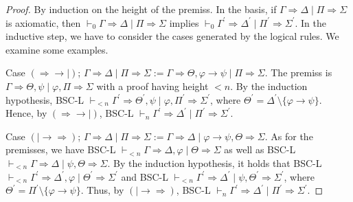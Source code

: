 \documentclass[10pt,a4paper]{article}
\theoremstyle{definition}
\newcommand{\3}{\vspace{.3in}}
\newcommand{\2}{\vspace{.2in}}
\newcommand{\1}{\vspace{.1in}}
\newcommand{\5}{\vspace{.05in}}
\begin{document}
\begin{proof}
	By induction on the height of the premiss. In the basis, if $ \Gamma\Rightarrow\Delta\mid\Pi\Rightarrow\Sigma $ is
	axiomatic, then $ \vdash_0\Gamma\Rightarrow\Delta\mid\Pi\Rightarrow\Sigma $ implies $ \vdash_0 \Gamma^\prime\Rightarrow\Delta^\prime\mid\Pi^\prime\Rightarrow\Sigma^\prime$. In the
	inductive step, we have to consider the cases generated by the logical rules. We examine some examples.
	
Case $ (\Rightarrow\rightarrow\mid) $; $ \Gamma\Rightarrow\Delta\mid\Pi\Rightarrow\Sigma:=\Gamma\Rightarrow\Theta,\varphi\rightarrow\psi\mid\Pi\Rightarrow\Sigma $. The premiss is $ \Gamma\Rightarrow\Theta,\psi\mid\varphi,\Pi\Rightarrow\Sigma $ with a proof having height $ < n $. By the induction hypothesis, BSC-L $ \vdash_{<n}\Gamma^\prime\Rightarrow\Theta^\prime,\psi\mid\varphi,\Pi^\prime\Rightarrow\Sigma^\prime $, where $ \Theta^\prime=\Delta^\prime\setminus\{\varphi\rightarrow\psi\} $. Hence, by $ (\Rightarrow\rightarrow\mid) $, BSC-L $ \vdash_{n}\Gamma^\prime\Rightarrow\Delta^\prime\mid\Pi^\prime\Rightarrow\Sigma^\prime $.

Case $ (\mid\rightarrow\Rightarrow) $; $ \Gamma\Rightarrow\Delta\mid\Pi\Rightarrow\Sigma:=\Gamma\Rightarrow\Delta\mid\varphi\rightarrow\psi,\Theta\Rightarrow\Sigma$. As for the premisses, we have BSC-L $ \vdash_{<n}\Gamma\Rightarrow\Delta,\varphi\mid\Theta\Rightarrow\Sigma$ as well as BSC-L  $ \vdash_{<n}\Gamma\Rightarrow\Delta\mid\psi,\Theta\Rightarrow\Sigma$. By the induction hypothesis, it holds that BSC-L $ \vdash_{<n}\Gamma^\prime\Rightarrow\Delta^\prime,\varphi\mid\Theta^\prime\Rightarrow\Sigma^\prime$ and BSC-L  $ \vdash_{<n}\Gamma^\prime\Rightarrow\Delta^\prime\mid\psi,\Theta^\prime\Rightarrow\Sigma^\prime$, where $ \Theta^\prime=\Pi^\prime\setminus\{\varphi\rightarrow\psi\} $. Thus, by $ (\mid\rightarrow\Rightarrow) $, BSC-L $ \vdash_{n}\Gamma^\prime\Rightarrow\Delta^\prime\mid\Pi^\prime\Rightarrow\Sigma^\prime $.
\end{proof}
\end{document}
